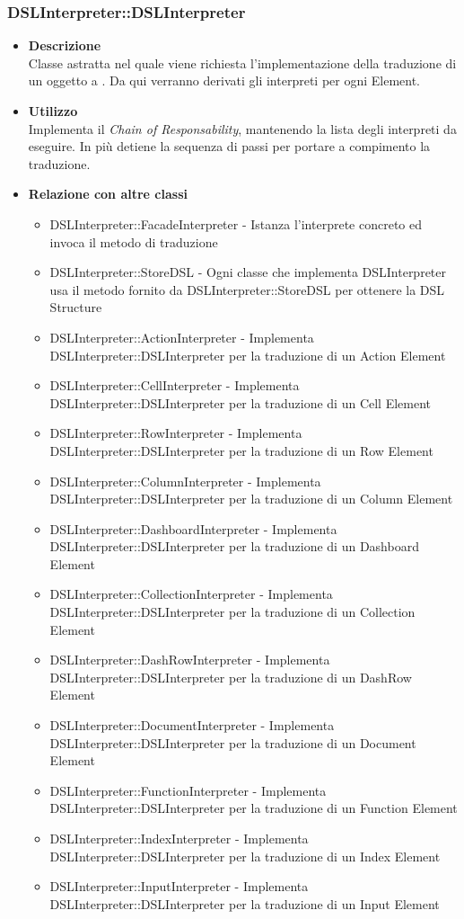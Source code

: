 \subsubsection{DSLInterpreter::DSLInterpreter}
\begin{itemize}
\item \textbf{Descrizione} \hfill \\
  Classe astratta nel quale viene richiesta l'implementazione della traduzione di un oggetto a . Da qui verranno derivati gli interpreti per ogni  Element.
\item \textbf{Utilizzo} \hfill \\
  Implementa il \textit{Chain of Responsability}, mantenendo la lista degli interpreti da eseguire. In più detiene la sequenza di passi per portare a compimento la traduzione.
\item \textbf{Relazione con altre classi} \hfill
  \begin{itemize}
  \item DSLInterpreter::FacadeInterpreter - Istanza l'interprete concreto ed invoca il metodo di traduzione
  \item DSLInterpreter::StoreDSL - Ogni classe che implementa DSLInterpreter usa il metodo fornito da DSLInterpreter::StoreDSL per ottenere la DSL Structure
  \item DSLInterpreter::ActionInterpreter - Implementa DSLInterpreter::DSLInterpreter per la traduzione di un Action Element
  \item DSLInterpreter::CellInterpreter - Implementa DSLInterpreter::DSLInterpreter per la traduzione di un Cell Element
  \item DSLInterpreter::RowInterpreter - Implementa DSLInterpreter::DSLInterpreter per la traduzione di un Row Element
  \item DSLInterpreter::ColumnInterpreter - Implementa DSLInterpreter::DSLInterpreter per la traduzione di un Column Element
  \item DSLInterpreter::DashboardInterpreter - Implementa DSLInterpreter::DSLInterpreter per la traduzione di un Dashboard Element
  \item DSLInterpreter::CollectionInterpreter - Implementa DSLInterpreter::DSLInterpreter per la traduzione di un Collection Element
  \item DSLInterpreter::DashRowInterpreter - Implementa DSLInterpreter::DSLInterpreter per la traduzione di un DashRow Element
  \item DSLInterpreter::DocumentInterpreter - Implementa DSLInterpreter::DSLInterpreter per la traduzione di un Document Element
  \item DSLInterpreter::FunctionInterpreter - Implementa DSLInterpreter::DSLInterpreter per la traduzione di un Function Element
  \item DSLInterpreter::IndexInterpreter - Implementa DSLInterpreter::DSLInterpreter per la traduzione di un Index Element
  \item DSLInterpreter::InputInterpreter - Implementa DSLInterpreter::DSLInterpreter per la traduzione di un Input Element
  \end{itemize}
\end{itemize}


